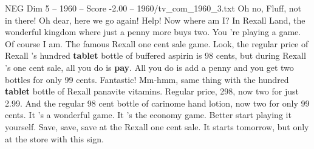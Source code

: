 \begin{textsample}{NEG Dim 5 – 1960 – Score -2.00 – 1960/tv\_com\_1960\_3.txt}  \label{ex:f5_neg_012}
Oh no, Fluff, not in there!
Oh dear, here we go again!
Help!
Now where am I?
In Rexall Land, the wonderful kingdom where just a penny more buys two.
You 're playing a game.
Of course I am.
The famous Rexall one cent sale game.
Look, the regular price of Rexall 's hundred \textbf{tablet} bottle of buffered aspirin is 98 cents, but during Rexall 's one cent sale, all you do is \textbf{pay}.
All you do is add a penny and you get two bottles for only 99 cents.
Fantastic!
Mm-hmm, same thing with the hundred \textbf{tablet} bottle of Rexall panavite vitamins.
Regular price, 298, now two for just 2.99.
And the regular 98 cent bottle of carinome hand lotion, now two for only 99 cents.
It 's a wonderful game.
It 's the economy game.
Better start playing it yourself.
Save, save, save at the Rexall one cent sale.
It starts tomorrow, but only at the store with this sign.

\end{textsample}
